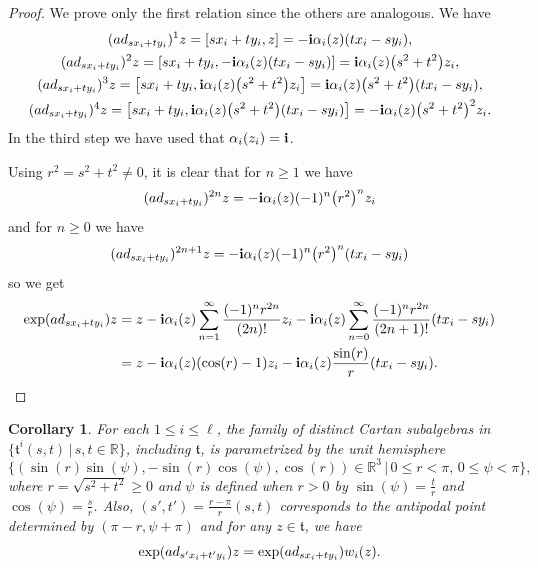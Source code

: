 \documentclass[11pt]{article}
\numberwithin{equation}{section}
\numberwithin{equation}{section}
\newtheorem{Corollary}[Theorem]{Corollary}
\def\R{\mathbb{R}}
\def\a{\alpha}
\def\bi{{\bf i}}
\def\ft{\mathfrak{t}}
\begin{document}
\begin{proof}We prove only the first relation since the others are analogous. We have
\begin{gather*}
({\rm ad}_{sx_i+ty_i})^1 z = [sx_i+ty_i,z] = -\bi\alpha_i(z) (tx_i-sy_i) ,\\
({\rm ad}_{sx_i+ty_i})^2 z = [sx_i+ty_i,-\bi\alpha_i(z) (tx_i-sy_i)] = \bi\alpha_i(z) \big(s^2+t^2\big) z_i ,\\
({\rm ad}_{sx_i+ty_i})^3 z = \big[sx_i+ty_i,\bi\alpha_i(z) \big(s^2+t^2\big) z_i\big] = \bi\alpha_i(z) \big(s^2+t^2\big)(tx_i-sy_i), \\
({\rm ad}_{sx_i+ty_i})^4 z = \big[sx_i+ty_i,\bi\alpha_i(z) \big(s^2+t^2\big)(tx_i-sy_i)\big] = -\bi\alpha_i(z) \big(s^2+t^2\big)^2 z_i .
\end{gather*}
In the third step we have used that $\a_i(z_i) = \bi$.

Using $r^2 = s^2+t^2 \neq 0$, it is clear that for $n\geq 1$ we have
\[({\rm ad}_{sx_i+ty_i})^{2n} z = -\bi\alpha_i(z) (-1)^n \big(r^2\big)^{n} z_i\]
and for $n\geq 0$ we have
\[({\rm ad}_{sx_i+ty_i})^{2n+1} z = -\bi\alpha_i(z) (-1)^n \big(r^2\big)^{n} (tx_i-sy_i)\]
so we get
\begin{align*}
\exp({\rm ad}_{sx_i+ty_i}) z & = z-\bi\alpha_i(z) \sum_{n=1}^\infty \frac{(-1)^n r^{2n}}{(2n)!} z_i -\bi\alpha_i(z)
\sum_{n=0}^\infty \frac{(-1)^n r^{2n}}{(2n+1)!} (tx_i-sy_i)\\
& = z -\bi\alpha_i(z) (\cos(r)-1) z_i -\bi\alpha_i(z) \frac{\sin(r)}{r} (tx_i-sy_i).\tag*{\qed}
\end{align*}\renewcommand{\qed}{}
\end{proof}

\begin{Corollary} \label{corollary:hemispherical_parametrization}
For each $1\leq i \leq \ell$, the family of distinct Cartan subalgebras in $\{\ft^i(s,t)\, |\, s,t\in\R\}$, including $\ft$, is parametrized by the unit hemisphere
\[\big\{(\sin(r)\sin(\psi),-\sin(r)\cos(\psi),\cos(r))\in\R^3\, |\, 0\leq r < \pi,\, 0\leq\psi<\pi\big\},\]
where $r = \sqrt{s^2 + t^2}\geq 0$ and $\psi$ is defined when $r > 0$ by
$\sin(\psi) = \frac{t}{r}$ and $\cos(\psi) = \frac{s}{r}$. Also, $(s',t') = \frac{r-\pi}{r}(s,t)$ corresponds to the antipodal
point determined by $(\pi-r,\psi+\pi)$ and for any $z\in\ft$, we have
\[\exp( {\rm ad}_{s'x_i+t'y_i}) z = \exp( {\rm ad}_{sx_i+ty_i}) w_i(z).\]
\end{Corollary}
\end{document}
